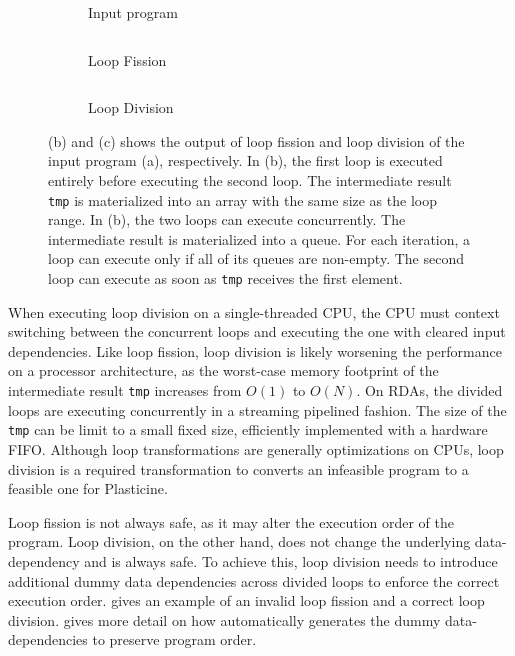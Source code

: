 \begin{figure}
\centering
\begin{subfigure}[b]{0.28\textwidth}
\inputminted{python}{code/loopexp1.py}
\caption{Input program}
\end{subfigure}
\hfill
\begin{subfigure}[b]{0.31\textwidth}
\inputminted{python}{code/loopexp1fission.py}
\caption{Loop Fission}
\end{subfigure}
\hfill
\begin{subfigure}[b]{0.32\textwidth}
\inputminted{python}{code/loopexp1division.py}
\caption{Loop Division}
\end{subfigure}
\caption[Loop fission vs. loop division]{
  (b) and (c) shows the output of loop fission and loop division of the input program (a), respectively.
  In (b), the first loop is executed entirely before executing the second loop. The intermediate
  result \texttt{tmp} is materialized into an array with the same size as the loop range.
  In (b), the two loops can execute concurrently. The intermediate result is materialized into a
  queue. For each iteration, a loop can execute only if all of its queues are non-empty.
  The second loop can execute as soon as \texttt{tmp} receives the first element.
}
\label{fig:loopexp1}
\end{figure}

When executing loop division on a single-threaded CPU, the CPU must context switching between the
concurrent loops
and executing the one with cleared input dependencies.
Like loop fission, loop division is likely worsening the performance on a processor architecture, as
the worst-case memory footprint of the intermediate result \texttt{tmp} increases from $O(1)$ to $O(N)$.
On RDAs, the divided loops are executing
concurrently in a streaming pipelined fashion. The size of the \texttt{tmp} can be limit to a small fixed
size, efficiently implemented with a hardware FIFO. 
Although loop transformations are generally optimizations on CPUs,
loop division is a required transformation to converts an infeasible program to a feasible one for Plasticine.

Loop fission is not always safe, as it may alter the execution order of the program.
Loop division, on the other hand, does not change the underlying data-dependency and is always safe.
To achieve this, loop division needs to introduce additional dummy data dependencies across divided
loops to enforce the correct execution order.
 gives an example of an invalid loop fission and a correct loop division.
 gives more detail on how \name automatically generates the dummy
data-dependencies to preserve program order.

